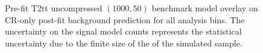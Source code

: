 \begin{figure}[!h]
{        \label{fig:T2tt_uncompressed_MR_4j}
    } \\
     ~~
     \\
    \caption{
        Pre-fit T2tt uncompressed $(1000,50)$ benchmark model overlay on
        CR-only post-fit background prediction for all analysis bins. The
        uncertainty on the signal model counts represents the statistical
        uncertainty due to the finite size of the of the simulated sample.
    }
    \label{fig:T2tt_uncompressed_MR}
\end{figure}

